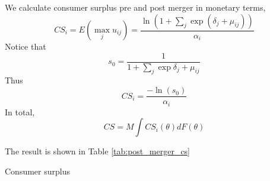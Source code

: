 \documentclass[12pt]{article}
\begin{document}
We calculate consumer surplus pre and post merger in monetary terms, $$CS_i =
    E(\max_j u_{ij})= \frac{\ln(1+\sum_j \exp(\delta_j+\mu_{ij}))}{\alpha_i}$$
Notice that $$s_0=\frac{1}{1+\sum_j \exp\delta_j+\mu_{ij}}$$ Thus
$$CS_i=\frac{-\ln(s_0)}{\alpha_i}$$ In total, $$ CS = M\int
    CS_i(\theta)dF(\theta)$$

The result is shown in Table \ref{tab:post_merger_cs}
\begin{table}[h!]\fontsize{10pt}{12pt}\selectfont
    \centering
    
    \caption{Consumer surplus}
    \label{tab:post_merger_cs}
\end{table}

\pagebreak \newpage

\end{document}
